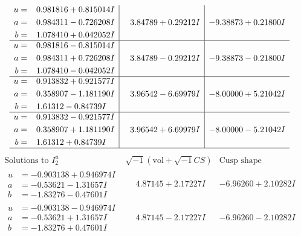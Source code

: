 \documentclass[1p]{elsarticle_modified}
\theoremstyle{definition}
\newcommand{\I}{\sqrt{-1}}
\begin{document}
$$\begin{array}{c|c|c}
\begin{aligned}
u &= \phantom{-}0.981816 + 0.815014 I \\
a &= \phantom{-}0.984311 - 0.726208 I \\
b &= \phantom{-}1.078410 + 0.042052 I\end{aligned}
 & \phantom{-}3.84789 + 0.29212 I & -9.38873 + 0.21800 I \\ \hline\begin{aligned}
u &= \phantom{-}0.981816 - 0.815014 I \\
a &= \phantom{-}0.984311 + 0.726208 I \\
b &= \phantom{-}1.078410 - 0.042052 I\end{aligned}
 & \phantom{-}3.84789 - 0.29212 I & -9.38873 - 0.21800 I \\ \hline\begin{aligned}
u &= \phantom{-}0.913832 + 0.921577 I \\
a &= \phantom{-}0.358907 - 1.181190 I \\
b &= \phantom{-}1.61312 - 0.84739 I\end{aligned}
 & \phantom{-}3.96542 - 6.69979 I & -8.00000 + 5.21042 I \\ \hline\begin{aligned}
u &= \phantom{-}0.913832 - 0.921577 I \\
a &= \phantom{-}0.358907 + 1.181190 I \\
b &= \phantom{-}1.61312 + 0.84739 I\end{aligned}
 & \phantom{-}3.96542 + 6.69979 I & -8.00000 - 5.21042 I\\
 \hline 
 \end{array}$$\newpage$$\begin{array}{c|c|c}  
\text{Solutions to }I^u_{2}& \I (\text{vol} + \sqrt{-1}CS) & \text{Cusp shape}\\
 \hline 
\begin{aligned}
u &= -0.903138 + 0.946974 I \\
a &= -0.53621 - 1.31657 I \\
b &= -1.83276 - 0.47601 I\end{aligned}
 & \phantom{-}4.87145 + 2.17227 I & -6.96260 + 2.10282 I \\ \hline\begin{aligned}
u &= -0.903138 - 0.946974 I \\
a &= -0.53621 + 1.31657 I \\
b &= -1.83276 + 0.47601 I\end{aligned}
 & \phantom{-}4.87145 - 2.17227 I & -6.96260 - 2.10282 I \\ \hline\begin{aligned}

\end{aligned}
\end{array}$$
\end{document}
